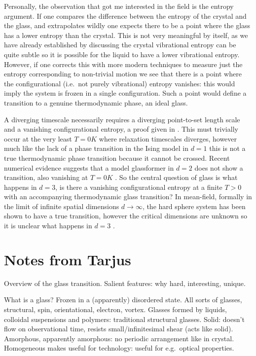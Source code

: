 \documentclass[11pt,twoside]{report}
\begin{document}
Personally, the observation that got me interested in the field is the entropy argument.
If one compares the difference between the entropy of the crystal and the glass, and extrapolates wildly one expects there to be a point where the glass has a lower entropy than the crystal.
This is not very meaningful by itself, as we have already established by discussing the crystal vibrational entropy can be quite subtle so it is possible for the liquid to have a lower vibrational entropy.
However, if one corrects this with more modern techniques to measure just the entropy corresponding to non-trivial motion we see that there is a point where the configurational (i.e.\ not purely vibrational) entropy vanishes: this would imply the system is frozen in a single configuration.
Such a point would define a transition to a genuine thermodynamic phase, an ideal glass.

A diverging timescale necessarily requires a diverging point-to-set length scale and a vanishing configurational entropy, a proof given in \cite{?}.
This must trivially occur at the very least $T=0\si{K}$ where relaxation timescales diverges, however much like the lack of a phase transition in the Ising model in $d=1$ this is not a true thermodynamic phase transition because it cannot be crossed.
Recent numerical evidence suggests that a model glassformer in $d=2$ does not show a transition, also vanishing at $T=0\si{K}$ \cite{Berthier?}.
So the central question of glass is what happens in $d=3$, is there a vanishing configurational entropy at a finite $T > 0$ with an accompanying thermodynamic glass transition?
In mean-field, formally in the limit of infinite spatial dimensions $d \to \infty$, the hard sphere system has been shown to have a true transition, however the critical dimensions are unknown so it is unclear what happens in $d=3$ \cite{Parisi,Zamboni,Charbonneau,Kurchan,?,?}.


\section{Notes from Tarjus}

Overview of the glass transition.
Salient features: why hard, interesting, unique.

What is a glass?
Frozen in a (apparently) disordered state.
All sorts of glasses, structural, spin, orientational, electron, vortex.
Glasses formed by liquids, colloidal suspensions and polymers: traditional structural glasses.
Solid: doesn't flow on observational time, resists small/infinitesimal shear (acts like solid).
Amorphous, apparently amorphous: no periodic arrangement like in crystal.
Homogeneous makes useful for technology: useful for e.g.\ optical properties.
\end{document}

